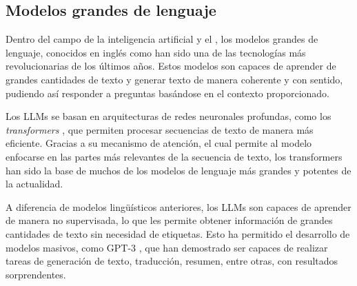 \subsection{Modelos grandes de lenguaje}
Dentro del campo de la inteligencia artificial y el , los modelos grandes de lenguaje, conocidos en inglés como  han sido una de las tecnologías más revolucionarias de los últimos años. Estos modelos son capaces de aprender de grandes cantidades de texto y generar texto de manera coherente y con sentido, pudiendo así responder a preguntas basándose en el contexto proporcionado.

Los \ac{LLM}s se basan en arquitecturas de redes neuronales profundas, como los \textit{transformers} \cite{attention2017}, que permiten procesar secuencias de texto de manera más eficiente. Gracias a su mecanismo de atención, el cual permite al modelo enfocarse en las partes más relevantes de la secuencia de texto, los transformers han sido la base de muchos de los modelos de lenguaje más grandes y potentes de la actualidad.

A diferencia de modelos lingüísticos anteriores, los \ac{LLM}s son capaces de aprender de manera no supervisada, lo que les permite obtener información de grandes cantidades de texto sin necesidad de etiquetas. Esto ha permitido el desarrollo de modelos masivos, como GPT-3 \cite{gpt32020}, que han demostrado ser capaces de realizar tareas de generación de texto, traducción, resumen, entre otras, con resultados sorprendentes.